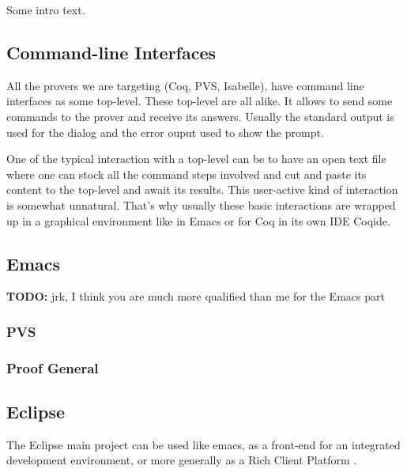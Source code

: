 \documentclass{entcs}
\newcommand{\todo}{\textbf{TODO: }}
\begin{document}
Some intro text. %

\subsection{Command-line Interfaces}
\label{subsec:comm-line-interf}

All the provers we are targeting (Coq, PVS, Isabelle), 
have command line interfaces as 
some top-level. These top-level are all alike. It allows to send some commands
to the prover and receive its answers. Usually the standard output is
used for the dialog and the error ouput used to show the prompt.

One of the typical interaction with a top-level can be to have 
an open text file
where one can stock all the command steps involved and cut and paste its 
content to the top-level and await its results. This user-active kind of 
interaction is somewhat unnatural. That's why usually these basic interactions
are wrapped up in a graphical environment like in Emacs or for Coq
in its own IDE Coqide.

\subsection{Emacs}
\label{subsec:emacs}

\todo{jrk, I think you are much more qualified than me for the Emacs
  part} %

\subsubsection{PVS}


\subsubsection{Proof General}

\subsection{Eclipse}
\label{subsec:eclipse}

The Eclipse main project can be used like emacs, as a front-end 
for an integrated development environment, or more generally as
a Rich Client Platform \cite{eclipse-rcp}. 
\end{document}

